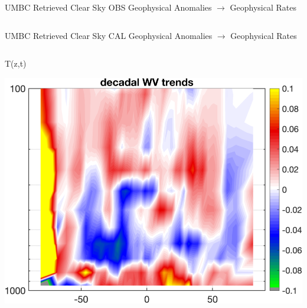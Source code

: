 \documentclass[10pt,t]{beamer}
\begin{document}
\begin{frame}{UMBC Retrieved Clear Sky OBS Geophysical Anomalies $\rightarrow$ Geophysical Rates}
\begin{columns}
\begin{column}{0.45\columnwidth}

\end{column}
\end{columns}
\end{frame}


\begin{frame}{UMBC Retrieved Clear Sky CAL Geophysical Anomalies $\rightarrow$ Geophysical Rates}
\vspace{-0.35in}

\begin{columns}
\begin{column}{0.45\columnwidth}
\begin{block}{\footnotesize T(z,t)}
\vspace{-0.1in}
\begin{center}
\includegraphics[width=\linewidth]{Figs/ClearAnom/umbc_clr_retr_cal_ptemp_rate_200209_201808.png}
\end{center}
\end{block}
\end{column}


\end{columns}
\end{frame}
\end{document}
